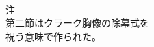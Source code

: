 \documentclass[10pt,b5j]{tarticle} %
\begin{document}
\begin{enumerate}
\begin{minipage}[c]{\blocksize}
        
    \end{minipage}
    \begin{minipage}[c]{\blocksize}
        
        \vspace{\linespace}
        \item~\\
        注\\
        第二節はクラーク胸像の除幕式を\\
        祝う意味で作られた。
    
    \end{minipage}
\end{enumerate} %
\end{document}
